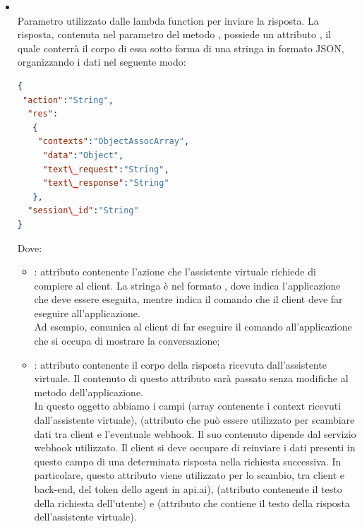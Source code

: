 \begin{itemize}
\begin{itemize}
\begin{itemize}
\begin{lstlisting}[language=json,firstnumber=1]
{
    "app":"nome\_applicazione",
    "query": "VAQuery"
}
\end{lstlisting}

con  stringa che corrisponde al nome dell'applicazione che manda la richiesta, e  oggetto del tipo  contenente i dati relativi alla query da mandare all'assistente virtuale;
			\item {} \\
			Parametro utilizzato dalle lambda function per inviare la risposta. La risposta, contenuta nel  parametro del metodo , possiede un attributo , il quale conterrà il corpo di essa sotto forma di una stringa in formato JSON, organizzando i dati nel seguente modo:
 \begin{lstlisting}[language=json,firstnumber=1]
{
 "action":"String",
  "res":
   {
    "contexts":"ObjectAssocArray",
     "data":"Object",
     "text\_request":"String",
     "text\_response":"String"
   },
  "session\_id":"String"
}
\end{lstlisting}
Dove:
\begin{itemize}
   \item {}: attributo contenente l'azione che l'assistente virtuale richiede di compiere al client. La stringa è nel formato , dove  indica l'applicazione che deve essere   eseguita, mentre  indica il comando che il client deve far eseguire all'applicazione. \\ Ad esempio,  comunica al client di far eseguire il comando  all'applicazione che si occupa di mostrare la conversazione;
   \item {}: attributo contenente il corpo della risposta ricevuta dall'assistente virtuale. Il contenuto di questo attributo sarà passato senza modifiche al metodo  dell'applicazione.\\ In questo oggetto abbiamo i campi  (array contenente i context ricevuti dall'assistente virtuale),  (attributo che può essere utilizzato per scambiare dati tra client e l'eventuale webhook. Il suo contenuto dipende dal servizio webhook utilizzato. Il client si deve occupare di reinviare i dati presenti in questo campo  di una determinata risposta nella richiesta successiva. In particolare, questo attributo viene utilizzato per lo scambio, tra client e back-end, del token dello agent in api.ai),  (attributo contenente il testo della richiesta dell'utente) e (attributo che contiene il testo della risposta dell'assistente virtuale).

\end{itemize}
\end{itemize}
\end{itemize}
\end{itemize}
